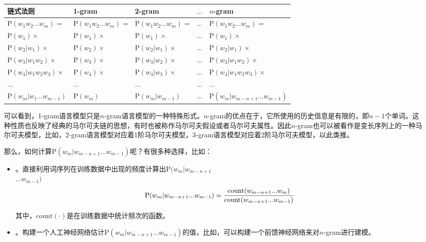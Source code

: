 \begin{center}
{\footnotesize
\begin{tabular}{l|l|l l|l}
链式法则 & 1-gram & 2-gram & $...$ & $n$-gram\\
 \hline
\rule{0pt}{10pt} $\textrm{P}(w_1 w_2...w_m)$ = & $\textrm{P}(w_1 w_2...w_m)$ = & $\textrm{P}(w_1 w_2...w_m)$ = & $...$ & $\textrm{P}(w_1 w_2...w_m)$ = \\
\rule{0pt}{10pt} $\textrm{P}(w_1)\times$ & $\textrm{P}(w_1)\times$ & $\textrm{P}(w_1)\times$  & $...$ & $\textrm{P}(w_1)\times$ \\
\rule{0pt}{10pt} $\textrm{P}(w_2|w_1)\times$ & $\textrm{P}(w_2)\times$ & $\textrm{P}(w_2|w_1)\times$ & $...$ & $\textrm{P}(w_2|w_1)\times$\\
\rule{0pt}{10pt} $\textrm{P}(w_3|w_1 w_2)\times$ & $\textrm{P}(w_3)\times$ & $\textrm{P}(w_3|w_2)\times$ & $...$ & $\textrm{P}(w_3|w_1 w_2)\times$ \\
\rule{0pt}{10pt} $\textrm{P}(w_4|w_1 w_2 w_3)\times$ & $\textrm{P}(w_4)\times$ & $\textrm{P}(w_4|w_3)\times$ & $...$ & $\textrm{P}(w_4|w_1 w_2 w_3)\times$ \\
\rule{0pt}{10pt} $...$ & $...$ & $...$ & $...$ & $...$ \\
\rule{0pt}{10pt} $\textrm{P}(w_m|w_1 ... w_{m-1})$ & $\textrm{P}(w_m)$ & $\textrm{P}(w_m|w_{m-1})$ & $...$ & $\textrm{P}(w_m|w_{m-n+1} ... w_{m-1})$
\end{tabular}
}
\end{center}

\parinterval 可以看到，1-gram语言模型只是$n$-gram语言模型的一种特殊形式。$n$-gram的优点在于，它所使用的历史信息是有限的，即$n-1$个单词。这种性质也反映了经典的马尔可夫链的思想\cite{liuke-markov-2004}\cite{resnick1992adventures}，有时也被称作马尔可夫假设或者马尔可夫属性。因此$n$-gram也可以被看作是变长序列上的一种马尔可夫模型，比如，2-gram语言模型对应着1阶马尔可夫模型，3-gram语言模型对应着2阶马尔可夫模型，以此类推。

\parinterval 那么，如何计算$\textrm{P}(w_m|w_{m-n+1} ... w_{m-1})$呢？有很多种选择，比如：

\begin{itemize}
\vspace{0.5em}
\item {\small{}}。直接利用词序列在训练数据中出现的频度计算出$\textrm{P}(w_m|w_{m-n+1}$\\$... w_{m-1})$
\begin{eqnarray}
\textrm{P}(w_m|w_{m-n+1}...w_{m-1})=\frac{\textrm{count}(w_{m-n+1}...w_m)}{\textrm{count}(w_{m-n+1}...w_{m-1})}
\label{eq:2-24}
\vspace{0.5em}
\end{eqnarray}

其中，$\textrm{count}(\cdot)$是在训练数据中统计频次的函数。

\vspace{0.3em}
\item {\small{}}。构建一个人工神经网络估计$\textrm{P}(w_m|w_{m-n+1} ... w_{m-1})$的值，比如，可以构建一个前馈神经网络来对$n$-gram进行建模。
\end{itemize}
\vspace{0.3em}

